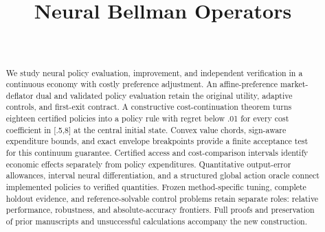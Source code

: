 \documentclass[ecta]{econsocart}
\theoremstyle{remark}
\begin{document}
\begin{frontmatter}
\title{Neural Bellman Operators}
\begin{aug}
\author[id=au1,addressref={add1}]{~}
\address[id=add1]{}
\end{aug}
\begin{abstract}
We study neural policy evaluation, improvement, and independent verification in a continuous economy with costly preference adjustment. An affine-preference market-deflator dual and validated policy evaluation retain the original utility, adaptive controls, and first-exit contract. A constructive cost-continuation theorem turns eighteen certified policies into a policy rule with regret below .01 for every cost coefficient in [.5,8] at the central initial state. Convex value chords, sign-aware expenditure bounds, and exact envelope breakpoints provide a finite acceptance test for this continuum guarantee. Certified access and cost-comparison intervals identify economic effects separately from policy expenditures. Quantitative output-error allowances, interval neural differentiation, and a structured global action oracle connect implemented policies to verified quantities. Frozen method-specific tuning, complete holdout evidence, and reference-solvable control problems retain separate roles: relative performance, robustness, and absolute-accuracy frontiers. Full proofs and preservation of prior manuscripts and unsuccessful calculations accompany the new construction.
\end{abstract}
\begin{keyword}
\end{keyword}
\end{frontmatter}

\begin{appendix}





\end{appendix}

\end{document}
